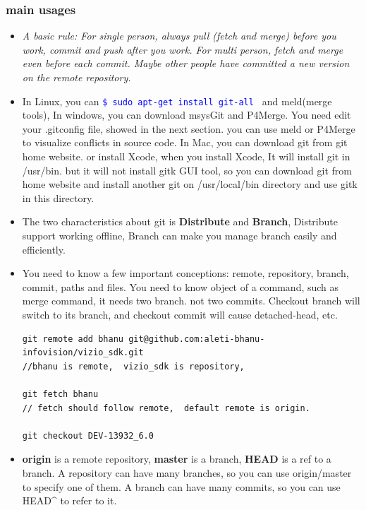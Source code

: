 \documentclass[a4paper,11pt,twoside]{book}
\newcommand{\linuxcommand}[1]{\texttt{\textcolor{blue}{\$ #1 \Pisymbol{psy}{191}}}}
\begin{document}
\subsubsection{main usages}
\begin{itemize}
	\item \emph{A basic rule:  For single person, always pull (fetch and merge) before you work,  commit and push after you work.  For multi person, fetch and merge even before each commit.  Maybe other people have committed a new version on the remote repository. }
	
	\item In Linux, you can \linuxcommand{sudo apt-get install git-all} and meld(merge tools), In windows, you can download msysGit and P4Merge. You need edit your .gitconfig file, showed in the next section. you can use meld or P4Merge to visualize conflicts in source code. In Mac, you can download git from git home website. or install Xcode, when you install Xcode, It will install git in /usr/bin. but it will not install gitk GUI tool, so you can download git from home website and install another git on /usr/local/bin directory and use gitk in this directory. 
	
	\item The two characteristics about git is \textbf{Distribute} and \textbf{Branch}, Distribute support working offline, Branch can make you manage branch easily and efficiently.
	
	\item You need to know a few important conceptions: remote, repository, branch, commit, paths and files. You need to know object of a command, such as merge command, it needs two branch. not two commits. Checkout branch will switch to its branch, and checkout commit will cause detached-head, etc.  
	
\begin{lstlisting}
git remote add bhanu git@github.com:aleti-bhanu-infovision/vizio_sdk.git
//bhanu is remote,  vizio_sdk is repository, 

git fetch bhanu
// fetch should follow remote,  default remote is origin.

git checkout DEV-13932_6.0	
\end{lstlisting}

	
	\item \textbf{origin} is a remote repository, \textbf{master} is a branch, \textbf{HEAD} is a ref to a branch. A repository can have many branches, so you can use origin/master to specify one of them. A branch can have many commits, so you can use HEAD\^{} to refer to it.
	

\end{itemize}
\end{document}
